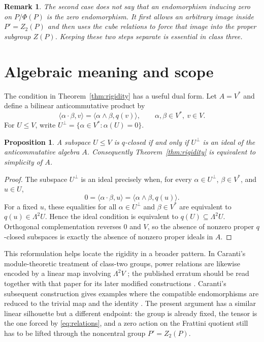 \documentclass[10pt,a4paper]{amsart}
\newtheorem{proposition}[theorem]{Proposition}
\newtheorem{remark}[theorem]{Remark}
\begin{document}
\begin{remark}\label{rem:notzero}
The second case does not say that an endomorphism inducing zero on
$P/\Phi(P)$ is the zero endomorphism.  It first allows an arbitrary image
inside $P'=Z_2(P)$ and then uses the cube relations to force that image
into the proper subgroup $Z(P)$.  Keeping these two steps separate is
essential in class three.
\end{remark}

\section{Algebraic meaning and scope}\label{sec:meaning}

The condition in Theorem~\ref{thm:rigidity} has a useful dual form.  Let
$A=V^*$ and define a bilinear anticommutative product by
\begin{equation}\label{eq:dualproduct}
 \langle \alpha\cdot\beta,v\rangle
   =\langle \alpha\wedge\beta,q(v)\rangle,
 \qquad \alpha,\beta\in V^*,\ v\in V.
\end{equation}
For $U\leq V$, write
$U^\perp=\{\alpha\in V^*: \alpha(U)=0\}$.

\begin{proposition}\label{prop:dual}
A subspace $U\leq V$ is $q$-closed if and only if $U^\perp$ is an ideal
of the anticommutative algebra $A$.  Consequently Theorem~\ref{thm:rigidity}
is equivalent to simplicity of $A$.
\end{proposition}

\begin{proof}
The subspace $U^\perp$ is an ideal precisely when, for every
$\alpha\in U^\perp$, $\beta\in V^*$, and $u\in U$,
\[
 0=\langle\alpha\cdot\beta,u\rangle
   =\langle\alpha\wedge\beta,q(u)\rangle.
\]
For a fixed $u$, these equalities for all $\alpha\in U^\perp$ and
$\beta\in V^*$ are equivalent to $q(u)\in\Lambda^2U$.  Hence the ideal
condition is equivalent to $q(U)\subseteq\Lambda^2U$.  Orthogonal
complementation reverses $0$ and $V$, so the absence of nonzero proper
$q$-closed subspaces is exactly the absence of nonzero proper ideals in
$A$.
\end{proof}

This reformulation helps locate the rigidity in a broader pattern.  In
Caranti's module-theoretic treatment of class-two groups, power relations
are likewise encoded by a linear map involving $\Lambda^2V$
\cite[Section~3]{Caranti15}; the published erratum should be read together
with that paper for its later modified constructions
\cite{CarantiErratum}.  Caranti's subsequent construction gives examples
where the compatible endomorphisms are reduced to the trivial map and the
identity \cite[Section~4]{Caranti16}.  The present argument has a similar
linear silhouette but a different endpoint: the group is already fixed,
the tensor is the one forced by \eqref{eq:relations}, and a zero action on
the Frattini quotient still has to be lifted through the noncentral group
$P'=Z_2(P)$.
\end{document}
